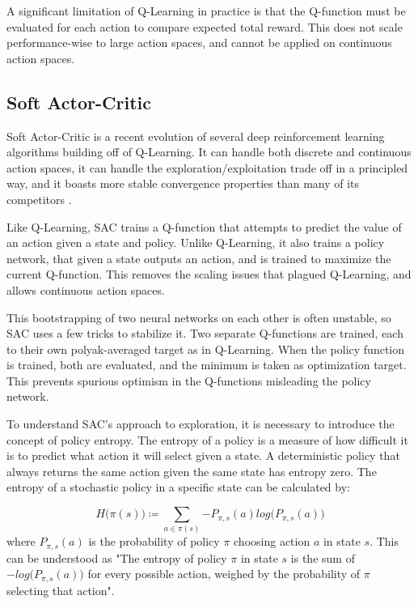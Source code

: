 
A significant limitation of Q-Learning in practice is that the Q-function must be evaluated for each action to compare expected total reward. This does not scale performance-wise to large action spaces, and cannot be applied on continuous action spaces.

\subsection{Soft Actor-Critic}

Soft Actor-Critic is a recent evolution of several deep reinforcement learning algorithms building off of Q-Learning. It can handle both discrete and continuous action spaces, it can handle the exploration/exploitation trade off in a principled way, and it boasts more stable convergence properties than many of its competitors \cite{SAC_main}.

Like Q-Learning, SAC trains a Q-function that attempts to predict the value of an action given a state and policy. Unlike Q-Learning, it also trains a policy network, that given a state outputs an action, and is trained to maximize the current Q-function. This removes the scaling issues that plagued Q-Learning, and allows continuous action spaces.

This bootstrapping of two neural networks on each other is often unstable, so SAC uses a few tricks to stabilize it. Two separate Q-functions are trained, each to their own polyak-averaged target as in Q-Learning. When the policy function is trained, both are evaluated, and the minimum is taken as optimization target. This prevents spurious optimism in the Q-functions misleading the policy network.

To understand SAC's approach to exploration, it is necessary to introduce the concept of policy entropy. The entropy of a policy is a measure of how difficult it is to predict what action it will select given a state. A deterministic policy that always returns the same action given the same state has entropy zero. The entropy of a stochastic policy in a specific state can be calculated by:

\begin{equation}
    H\big(\pi(s)\big) \coloneqq \sum_{a \in \pi(s)}{-P_{\pi, s}(a) log\big(P_{\pi, s}(a)\big)}
\end{equation} where $P_{\pi, s}(a)$ is the probability of policy $\pi$ choosing action $a$ in state $s$. This can be understood as "The entropy of policy $\pi$ in state $s$ is the sum of $-log\big(P_{\pi, s}(a)\big)$ for every possible action, weighed by the probability of $\pi$ selecting that action".

